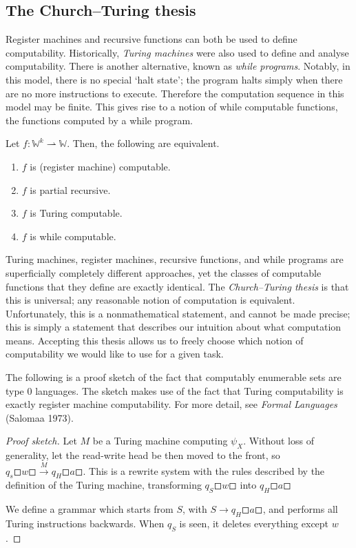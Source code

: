 \subsection{The Church--Turing thesis}
Register machines and recursive functions can both be used to define computability.
Historically, \emph{Turing machines} were also used to define and analyse computability.
There is another alternative, known as \emph{while programs}.
Notably, in this model, there is no special `halt state'; the program halts simply when there are no more instructions to execute.
Therefore the computation sequence in this model may be finite.
This gives rise to a notion of while computable functions, the functions computed by a while program.

\begin{theorem}
	Let \( f \colon \mathbb W^k \rightharpoonup \mathbb W \).
	Then, the following are equivalent.
	\begin{enumerate}
		\item \( f \) is (register machine) computable.
		\item \( f \) is partial recursive.
		\item \( f \) is Turing computable.
		\item \( f \) is while computable.
	\end{enumerate}
\end{theorem}
Turing machines, register machines, recursive functions, and while programs are superficially completely different approaches, yet the classes of computable functions that they define are exactly identical.
The \emph{Church--Turing thesis} is that this is universal; any reasonable notion of computation is equivalent.
Unfortunately, this is a nonmathematical statement, and cannot be made precise; this is simply a statement that describes our intuition about what computation means.
Accepting this thesis allows us to freely choose which notion of computability we would like to use for a given task.

The following is a proof sketch of the fact that computably enumerable sets are type 0 languages.
The sketch makes use of the fact that Turing computability is exactly register machine computability.
For more detail, see \emph{Formal Languages} (Salomaa 1973).
\begin{proof}[Proof sketch]
	Let \( M \) be a Turing machine computing \( \psi_X \).
	Without loss of generality, let the read-write head be then moved to the front, so \( q_s \mdwhtsquare w \mdwhtsquare \xrightarrow M q_H \mdwhtsquare a \mdwhtsquare \).
	This is a rewrite system with the rules described by the definition of the Turing machine, transforming \( q_S \mdwhtsquare w \mdwhtsquare \) into \( q_H \mdwhtsquare a \mdwhtsquare \)

	We define a grammar which starts from \( S \), with \( S \to q_H \mdwhtsquare a \mdwhtsquare \), and performs all Turing instructions backwards.
	When \( q_S \) is seen, it deletes everything except \( w \).
\end{proof}

